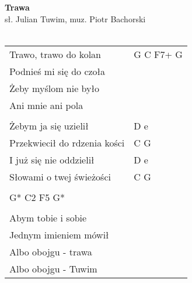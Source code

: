 \documentclass[a5paper]{article}
\begin{document}


\noindent
\fontsize{12pt}{15pt}\selectfont
\textbf{Trawa} \\
\fontsize{8pt}{10pt}\selectfont
sł. Julian Tuwim, muz. Piotr Bachorski \\ \\
\fontsize{10pt}{12pt}\selectfont
{}
\begin{tabular}{@{}p{6.50cm}p{3cm}@{}}
\noindent
Trawo, trawo do kolan & G C F7+ G \\
Podnieś mi się do czoła & \\
Żeby myślom nie było & \\
Ani mnie ani pola & \\ \\

Żebym ja się uzielił & D e \\
Przekwiecił do rdzenia kości & C G \\
I już się nie oddzielił & D e \\
Słowami o twej świeżości & C G \\ \\

G* C2 F5 G* \\ \\

Abym tobie i sobie & \\
Jednym imieniem mówił & \\
Albo obojgu - trawa & \\
Albo obojgu - Tuwim
\end{tabular}
\end{document}
